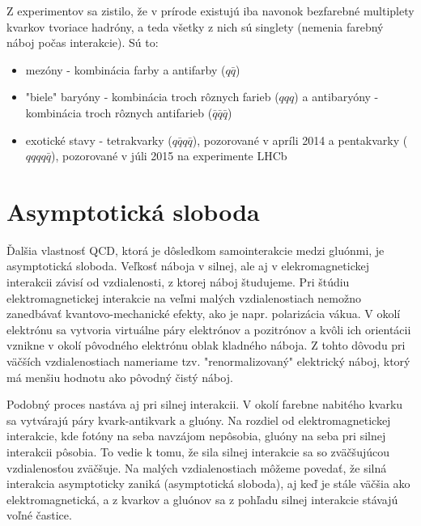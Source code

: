 \documentclass[thesismargins, thesislinespacing]{rnthesis}
\begin{document}
Z experimentov sa zistilo, že v prírode existujú iba navonok bezfarebné multiplety kvarkov tvoriace hadróny, a teda všetky z nich sú singlety (nemenia farebný náboj počas interakcie). Sú to:
\begin{itemize}
	\item mezóny - kombinácia farby a antifarby ($q \bar q$)
	\item "biele" baryóny - kombinácia troch rôznych farieb ($qqq$) a antibaryóny - kombinácia troch rôznych antifarieb ($\bar q \bar q \bar q$)
	\item exotické stavy - tetrakvarky ($q \bar q q \bar q$), pozorované v apríli 2014 \cite{tetra} a pentakvarky ($qqqq \bar q $), pozorované v júli 2015 na experimente LHCb \cite{2}
\end{itemize}

\section{Asymptotická sloboda}
Ďalšia vlastnosť QCD, ktorá je dôsledkom samointerakcie medzi gluónmi, je asymptotická sloboda. 
Veľkosť náboja v silnej, ale aj v elekromagnetickej interakcii závisí od vzdialenosti, z ktorej náboj študujeme. Pri štúdiu elektromagnetickej interakcie na veľmi malých vzdialenostiach nemožno zanedbávať kvantovo-mechanické efekty, ako je napr. polarizácia vákua. V okolí elektrónu sa vytvoria virtuálne páry elektrónov a pozitrónov a kvôli ich  orientácii vznikne v okolí pôvodného elektrónu oblak kladného náboja. Z tohto dôvodu pri väčších vzdialenostiach nameriame tzv. "renormalizovaný" \-e\-lektrický náboj, ktorý má menšiu hodnotu ako pôvodný čistý náboj.

Podobný proces nastáva aj pri silnej interakcii. V okolí farebne nabitého kvarku sa vytvárajú páry kvark-antikvark a gluóny. Na rozdiel od elektromagnetickej interakcie, kde fotóny na seba navzájom nepôsobia, gluóny na seba pri silnej interakcii pôsobia. To vedie k tomu, že sila silnej interakcie sa so zväčšujúcou vzdialenosťou zväčšuje. Na malých vzdialenostiach môžeme povedať, že silná interakcia asymptoticky zaniká (asymptotická sloboda), aj keď je stále väčšia ako elektromagnetická, a z kvarkov a gluónov sa z pohľadu silnej interakcie stávajú voľné častice. 
\end{document}
